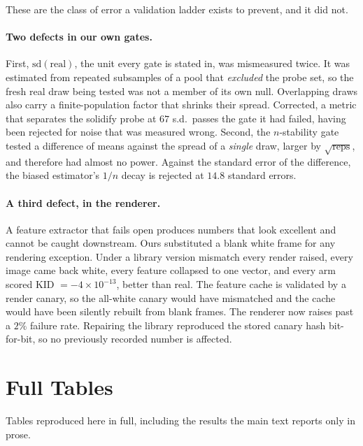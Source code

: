 These are the class of error a validation ladder exists to prevent, and it did
not.

\paragraph{Two defects in our own gates.} First,
$\mathrm{sd}(\text{real})$, the unit every gate is stated in, was mismeasured
twice. It was estimated from repeated subsamples of a pool that \emph{excluded}
the probe set, so the fresh real draw being tested was not a member of its own
null. Overlapping draws also carry a finite-population factor that shrinks their
spread. Corrected, a metric that separates the solidify probe at $67$ s.d.\ passes
the gate it had failed, having been rejected for noise that was measured wrong.
Second, the $n$-stability gate tested a difference of means against the spread
of a \emph{single} draw, larger by $\sqrt{\text{reps}}$, and therefore had almost
no power. Against the standard error of the difference, the biased estimator's
$1/n$ decay is rejected at $14.8$ standard errors.

\paragraph{A third defect, in the renderer.} A feature extractor that fails
open produces numbers that look excellent and cannot be caught downstream. Ours
substituted a blank white frame for any rendering exception. Under a library
version mismatch every render raised, every image came back white, every feature
collapsed to one vector, and every arm scored KID $=-4\times 10^{-13}$, better
than real. The feature cache is validated by a render canary, so the all-white
canary would have mismatched and the cache would have been silently rebuilt from
blank frames. The renderer now raises past a $2\%$ failure rate. Repairing the
library reproduced the stored canary hash bit-for-bit, so no previously recorded
number is affected.

\section{Full Tables}
\label{app:tables}

Tables reproduced here in full, including the results the main text reports only in
prose.

